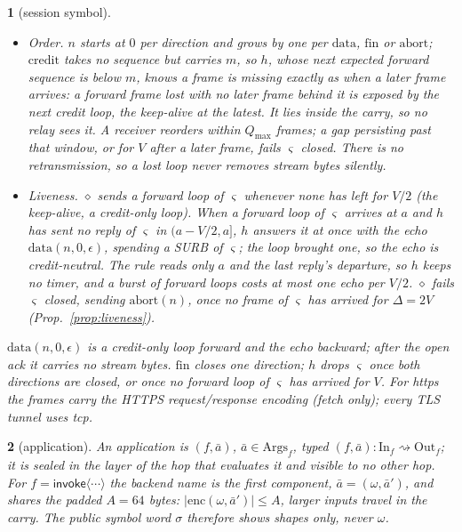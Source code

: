 \documentclass[journal]{IEEEtran}
\newcommand{\namedhead}{}
\newtheorem*{namedenv}{\namedhead}
\newenvironment{defD}[2]{\renewcommand{\namedhead}{Definition #1}%
  \begin{namedenv}[#2]}{\end{namedenv}}
\newcommand{\cl}{\diamond}
\newcommand{\enc}{\mathrm{enc}}
\newcommand{\Args}{\mathrm{Args}}
\newcommand{\In}{\mathrm{In}}
\newcommand{\Out}{\mathrm{Out}}
\newcommand{\sid}{\varsigma}
\DeclareRobustCommand{\code}[1]{{\ttfamily\renewcommand{\_}{\textunderscore\allowbreak}#1}}
\begin{document}
\begin{defD}{D2$'$}{session symbol}
\begin{itemize}
  refused is answered $\mathrm{abort}(0)$ under that loop's own SURB, so a
  failure without a SURB reaches $\cl$ at its next loop.  $\mathrm{fin}$ is
  sent only when the world's bytes really ended.
\item \emph{Order.}  $n$ starts at $0$ per direction and grows by one per
  $\mathrm{data}$, $\mathrm{fin}$ or $\mathrm{abort}$; $\mathrm{credit}$
  takes no sequence but carries $m$, so $h$, whose next expected forward
  sequence is below $m$, knows a frame is missing exactly as when a later
  frame arrives: a forward frame lost with no later frame behind it is
  exposed by the next credit loop, the keep-alive at the latest.  It
  lies inside the carry, so no relay sees it.  A receiver reorders within
  $Q_{\max}$ frames; a gap persisting past that window, or for $V$ after a
  later frame, fails $\sid$ closed.  There is no retransmission, so a lost
  loop never removes stream bytes silently.
\end{itemize}
\begin{itemize}
\item \emph{Liveness.}  $\cl$ sends a forward loop of $\sid$ whenever none
  has left for $V/2$ (the keep-alive, a credit-only loop).  When a forward
  loop of $\sid$ arrives at $a$ and $h$ has sent no reply of $\sid$ in
  $(a-V/2,a]$, $h$ answers it at once with the
  echo $\mathrm{data}(n,0,\epsilon)$, spending a SURB of $\sid$; the loop
  brought one, so the echo is credit-neutral.  The rule reads only $a$ and
  the last reply's departure, so $h$ keeps no timer, and a burst of forward
  loops costs at most one echo per $V/2$.  $\cl$ fails $\sid$ closed,
  sending $\mathrm{abort}(n)$, once no frame of $\sid$ has arrived for
  $\Delta=2V$ (Prop.~\ref{prop:liveness}).
\end{itemize}
$\mathrm{data}(n,0,\epsilon)$ is a credit-only loop forward and the echo
backward; after the open ack it carries no stream bytes.
$\mathrm{fin}$ closes one direction; $h$ drops $\sid$ once both directions
are closed, or once no forward loop of $\sid$ has arrived for $V$.
For \code{https} the frames carry the HTTPS request/response encoding
(fetch only); every TLS tunnel uses \code{tcp}.
\end{defD}

\begin{defD}{D3}{application}
An application is $(f,\bar a)$, $\bar a\in\Args_f$, typed
$(f,\bar a):\In_f\rightsquigarrow\Out_f$; it is sealed in the layer of the
hop that evaluates it and visible to no other hop.  For
$f=\mathsf{invoke}\langle\cdots\rangle$ the backend name is the first
component, $\bar a=(\omega,\bar a')$, and shares the padded $A=64$ bytes:
$|\enc(\omega,\bar a')|\le A$, larger inputs travel in the carry.  The
public symbol word $\sigma$ therefore shows shapes only, never $\omega$.
\end{defD}
\end{document}
